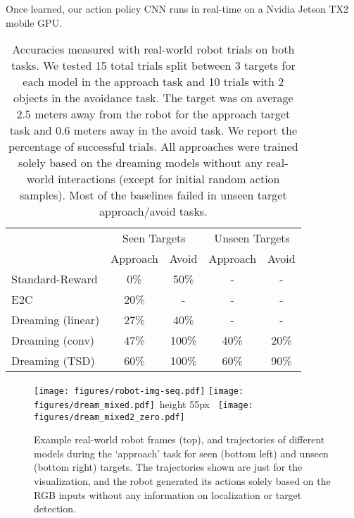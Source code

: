 \documentclass[letterpaper, 10 pt, conference]{ieeeconf}
\newcommand{\rulesep}{\unskip\ \vrule width 0.75pt height 55px\ }
\begin{document}
Once learned, our action policy CNN runs in real-time on a Nvidia Jetson TX2 mobile GPU. 





\begin{table}
\small
  \caption{Accuracies measured with real-world robot trials on both tasks. We tested 15 total trials split between 3 targets for each model in the approach task and 10 trials with 2 objects in the avoidance task. The target was on average 2.5 meters away from the robot for the approach target task and 0.6 meters away in the avoid task. We report the percentage of successful trials. All approaches were trained solely based on the dreaming models without any real-world interactions (except for initial random action samples). Most of the baselines failed in unseen target approach/avoid tasks.}
  \label{tab:real}
  \centering
  \begin{tabular}{lcccc}
    \toprule
       & \multicolumn{2}{c}{Seen Targets} &    \multicolumn{2}{c}{Unseen Targets}\\
       \cmidrule(r){2-3}  \cmidrule(r){4-5}
         &  Approach    & Avoid  & Approach & Avoid\\
    \midrule
     Standard-Reward & 0\% & 50\%  & - & -\\
     E2C \cite{watter2015embed} & 20\% & - & - & -\\
     Dreaming (linear) & 27\% & 40\% & - & - \\
     Dreaming (conv) & 47\% & 100\% & 40\% & 20\%\\
     Dreaming (TSD) & 60\% & 100\% & 60\% & 90\%\\
    \bottomrule
  \end{tabular}
\end{table}



\begin{figure*}
    \centering
    \texttt{[image: figures/robot-img-seq.pdf]}
      \texttt{[image: figures/dream\_mixed.pdf]}\rulesep
      \texttt{[image: figures/dream\_mixed2\_zero.pdf]}
      \caption{Example real-world robot frames (top), and trajectories of different models during the `approach' task for seen (bottom left) and unseen (bottom right) targets. The trajectories shown are just for the visualization, and the robot generated its actions solely based on the RGB inputs without any information on localization or target detection.} %
      \label{fig:real-traj}
\end{figure*}
\end{document}
